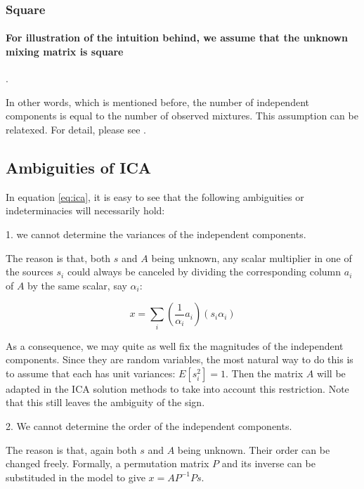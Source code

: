 \documentclass[a4paper]{book}
\begin{document}
      \subsubsection{Square}

      \paragraph{For illustration of the intuition behind, we assume
        that the unknown mixing matrix is square}.

      In other words, which is mentioned before, the number of
      independent components is equal to the number of observed
      mixtures. This assumption can be relatexed. For detail, please see
      \cite{hyvärinen2004independent}.

    \subsection{Ambiguities of ICA}

    In equation \ref{eq:ica}, it is easy to see that the following
    ambiguities or indeterminacies will necessarily hold:

    1. we cannot determine the variances of the independent components.

    The reason is that, both $s$ and $A$ being unknown, any scalar
    multiplier in one of the sources $s_{i}$ could always be canceled by
    dividing the corresponding column $a_i$ of $A$ by the same scalar,
    say $\alpha_{i}$:

    \begin{displaymath}
      x = \sum\limits^{}_{i}(\frac{1}{\alpha_{i}}a_{i})(s_{i}\alpha_{i})
    \end{displaymath}

    As a consequence, we may quite as well fix the magnitudes of the
    independent components. Since they are random variables, the most
    natural way to do this is to assume that each has unit variances:
    $E[s_{i}^{2}] = 1$. Then the matrix $A$ will be adapted in the ICA
    solution methods to take into account this restriction. Note that
    this still leaves the ambiguity of the sign.

    2. We cannot determine the order of the independent components.

    The reason is that, again both $s$ and $A$ being unknown. Their
    order can be changed freely. Formally, a permutation matrix $P$ and
    its inverse can be substituded in the model to give $x = AP^{-1}Ps$.
\end{document}
